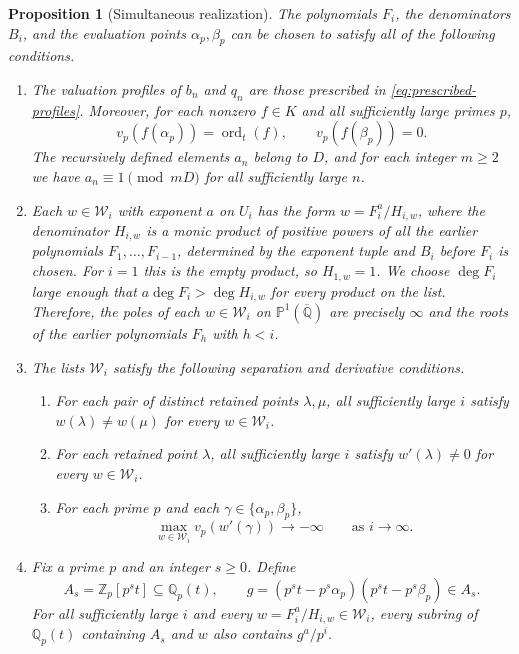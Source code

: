 \documentclass{article}
\DeclareMathOperator{\ord}{ord}
\newtheorem{proposition}{Proposition}[section]
\theoremstyle{remark}
\begin{document}
\begin{proposition}[Simultaneous realization]
    \label{prop:simultaneous-realization}
    The polynomials $F_i$, the denominators $B_i$, and the evaluation points $\alpha_p, \beta_p$ can be chosen to satisfy all of the following conditions.
    \begin{enumerate}
        \item The valuation profiles of $b_n$ and $q_n$ are those prescribed in \eqref{eq:prescribed-profiles}.
        Moreover, for each nonzero $f \in K$ and all sufficiently large primes $p$,
        \[
            v_p(f(\alpha_p)) = \ord_t(f), \qquad v_p(f(\beta_p)) = 0.
        \]
        The recursively defined elements $a_n$ belong to $D$, and for each integer $m \ge 2$ we have $a_n \equiv 1 \pmod{mD}$ for all sufficiently large $n$.

        \item Each $w \in \mathcal{W}_i$ with exponent $a$ on $U_i$ has the form $w = F_i^a/H_{i, w}$, where the denominator $H_{i, w}$ is a monic product of positive powers of all the earlier polynomials $F_1, \ldots, F_{i - 1}$, determined by the exponent tuple and $B_i$ before $F_i$ is chosen.
        For $i = 1$ this is the empty product, so $H_{1, w} = 1$.
        We choose $\deg F_i$ large enough that $a \deg F_i > \deg H_{i, w}$ for every product on the list.
        Therefore, the poles of each $w \in \mathcal{W}_i$ on $\mathbb{P}^1(\overline{\mathbb{Q}})$ are precisely $\infty$ and the roots of the earlier polynomials $F_h$ with $h < i$.

        \item The lists $\mathcal{W}_i$ satisfy the following separation and derivative conditions.
        \begin{enumerate}
            \item For each pair of distinct retained points $\lambda, \mu$, all sufficiently large $i$ satisfy $w(\lambda) \ne w(\mu)$ for every $w \in \mathcal{W}_i$.
            \item For each retained point $\lambda$, all sufficiently large $i$ satisfy $w'(\lambda) \ne 0$ for every $w \in \mathcal{W}_i$.
            \item For each prime $p$ and each $\gamma \in \{\alpha_p, \beta_p\}$,
            \[
                \max_{w \in \mathcal{W}_i} v_p(w'(\gamma)) \longrightarrow -\infty
                \qquad \text{as } i \longrightarrow \infty.
            \]
        \end{enumerate}

        \item Fix a prime $p$ and an integer $s \ge 0$.
        Define
        \[
            A_s = \mathbb{Z}_p[p^s t] \subseteq \mathbb{Q}_p(t), \qquad g = (p^s t - p^s\alpha_p)(p^s t - p^s\beta_p) \in A_s.
        \]
        For all sufficiently large $i$ and every $w = F_i^a/H_{i, w} \in \mathcal{W}_i$, every subring of $\mathbb{Q}_p(t)$ containing $A_s$ and $w$ also contains $g^a/p^i$.
    \end{enumerate}
\end{proposition}
\end{document}
